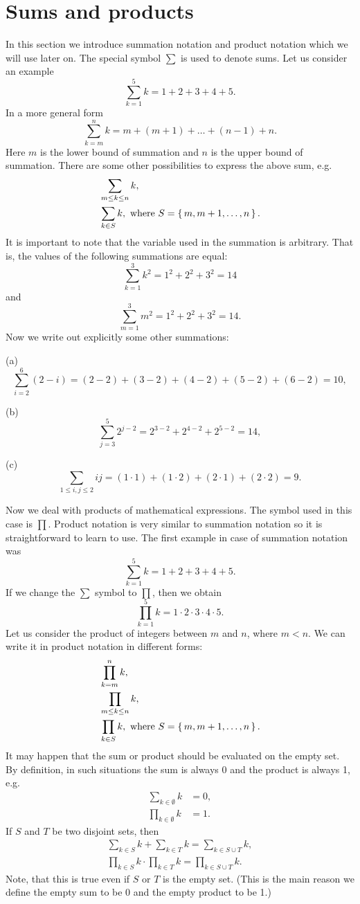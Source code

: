 \section{Sums and products}\label{sec:sumsproducts}
In this section we introduce summation notation and product notation which we will use later on.
The special symbol $\sum$ is used to denote sums. Let us consider an example
$$
\sum_{k=1}^5 k=1+2+3+4+5.
$$
In a more general form
$$
\sum_{k=m}^n k=m+(m+1)+\ldots+(n-1)+n.
$$
Here $m$ is the lower bound of summation and $n$ is the upper bound of summation.
There are some other possibilities to express the above sum, e.g.\
\begin{align*}
&\sum_{m\leq k\leq n}k,\\
&\sum_{k\in S}k, \mbox{ where }S=\left\{\,m,m+1,\ldots,n\,\right\}.
\end{align*}
It is important to note that the variable used in the summation is arbitrary. That is, 
the values of the following summations are equal:
$$
\sum_{k=1}^3 k^2=1^2+2^2+3^2=14
$$
and
$$
\sum_{m=1}^3 m^2=1^2+2^2+3^2=14.
$$
Now we write out explicitly some other summations:

(a) $$\sum_{i=2}^6 (2-i)=(2-2)+(3-2)+(4-2)+(5-2)+(6-2)=10,$$

(b) $$\sum_{j=3}^5 2^{j-2}=2^{3-2}+2^{4-2}+2^{5-2}=14,$$

(c) $$\sum_{1\leq i,j\leq 2} ij= (1\cdot 1)+(1\cdot 2)+(2\cdot 1)+(2\cdot 2)=9.$$

Now we deal with products of mathematical expressions. The symbol used in this case is $\prod$.
Product notation is very similar to summation notation so it is straightforward to learn to use.
The first example in case of summation notation was 
$$
\sum_{k=1}^5 k=1+2+3+4+5.
$$
If we change the $\sum$ symbol to $\prod$, then we obtain
$$
\prod_{k=1}^5 k=1\cdot 2\cdot 3\cdot 4\cdot 5.
$$
Let us consider the product of integers between $m$ and $n$, where $m<n$. We can write it in 
product notation in different forms:
\begin{align*}
&\prod_{k=m}^n k,\\
&\prod_{m\leq k\leq n}k,\\
&\prod_{k\in S}k, \mbox{ where }S=\left\{\,m,m+1,\ldots,n\,\right\}.
\end{align*}
It may happen that the sum or product should be evaluated on the empty set. 
By definition, in such situations the sum is always 0 and the product is always 1, 
e.g.\
\begin{align*}
\sum_{k \in \emptyset} k &= 0, \\
\prod_{k \in \emptyset} k &= 1. 
\end{align*}
If $S$ and $T$ be two disjoint sets, then 
\begin{align*}
\sum_{k \in S} k + \sum_{k \in T} k = \sum_{k \in S \cup T} k, \\
\prod_{k \in S} k \cdot \prod_{k \in T} k = \prod_{k \in S \cup T} k. 
\end{align*}
Note, that this is true even if $S$ or $T$ is the empty set. 
(This is the main reason we define the empty sum to be 0 and the empty product to be 1.)

